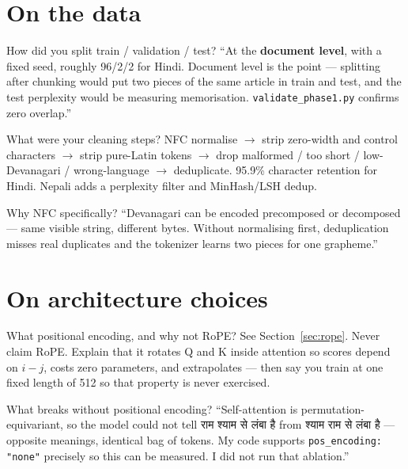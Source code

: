 \documentclass[11pt]{report}
\newcommand{\dn}[1]{{\devanagarifont #1}}
\newcommand{\p}[1]{\texttt{#1}}
\begin{document}
\section{On the data}

\begin{qabox}{How did you split train / validation / test?}
``At the \textbf{document level}, with a fixed seed, roughly 96/2/2 for Hindi.
Document level is the point --- splitting after chunking would put two pieces of
the same article in train and test, and the test perplexity would be measuring
memorisation. \p{validate\_phase1.py} confirms zero overlap.''
\end{qabox}

\begin{qabox}{What were your cleaning steps?}
NFC normalise $\rightarrow$ strip zero-width and control characters $\rightarrow$
strip pure-Latin tokens $\rightarrow$ drop malformed / too short / low-Devanagari
/ wrong-language $\rightarrow$ deduplicate. 95.9\% character retention for Hindi.
Nepali adds a perplexity filter and MinHash/LSH dedup.
\end{qabox}

\begin{qabox}{Why NFC specifically?}
``Devanagari can be encoded precomposed or decomposed --- same visible string,
different bytes. Without normalising first, deduplication misses real duplicates
and the tokenizer learns two pieces for one grapheme.''
\end{qabox}

\section{On architecture choices}

\begin{qabox}{What positional encoding, and why not RoPE?}
See Section~\ref{sec:rope}. Never claim RoPE. Explain that it rotates Q and K
inside attention so scores depend on $i-j$, costs zero parameters, and
extrapolates --- then say you train at one fixed length of 512 so that property
is never exercised.
\end{qabox}

\begin{qabox}{What breaks without positional encoding?}
``Self-attention is permutation-equivariant, so the model could not tell
\dn{राम श्याम से लंबा है} from \dn{श्याम राम से लंबा है} --- opposite meanings,
identical bag of tokens. My code supports \p{pos\_encoding: "none"} precisely so
this can be measured. I did not run that ablation.''
\end{qabox}
\end{document}
